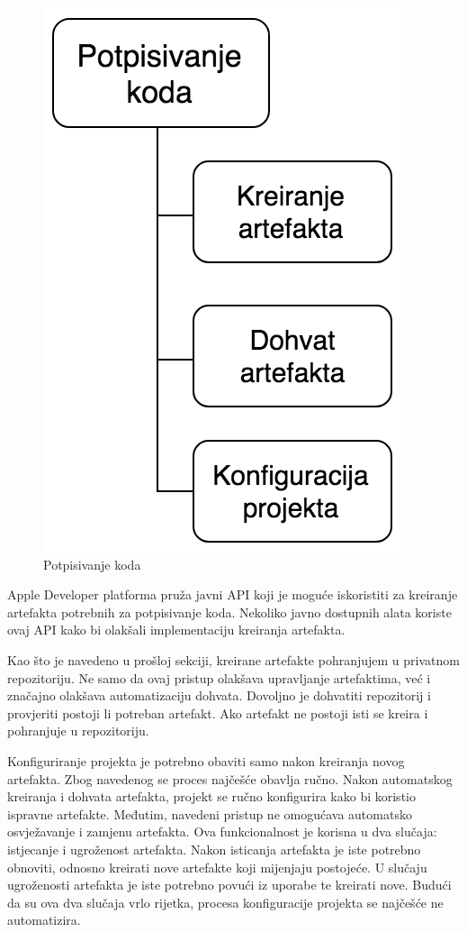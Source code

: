 \documentclass[times, utf8, diplomski, numeric]{fer}
\begin{document}
\begin{figure}
\centering
\includegraphics[scale=0.6]{CodeSigning}
\caption{Potpisivanje koda}
\label{fig:CodeSigning}
\end{figure}

Apple Developer platforma pruža javni API koji je moguće iskoristiti za kreiranje artefakta potrebnih za potpisivanje koda. Nekoliko javno dostupnih alata koriste ovaj API kako bi olakšali implementaciju kreiranja artefakta.

Kao što je navedeno u prošloj sekciji, kreirane artefakte pohranjujem u privatnom repozitoriju. Ne samo da ovaj pristup olakšava upravljanje artefaktima, već i značajno olakšava automatizaciju dohvata. Dovoljno je dohvatiti repozitorij i provjeriti postoji li potreban artefakt. Ako artefakt ne postoji isti se kreira i pohranjuje u repozitoriju.

Konfiguriranje projekta je potrebno obaviti samo nakon kreiranja novog artefakta. Zbog navedenog se proces najčešće obavlja ručno. Nakon automatskog kreiranja i dohvata artefakta, projekt se ručno konfigurira kako bi koristio ispravne artefakte. Međutim, navedeni pristup ne omogućava automatsko osvježavanje i zamjenu artefakta. Ova funkcionalnost je korisna u dva slučaja: istjecanje i ugroženost artefakta. Nakon isticanja artefakta je iste potrebno obnoviti, odnosno kreirati nove artefakte koji mijenjaju postojeće. U slučaju ugroženosti artefakta je iste potrebno povući iz uporabe te kreirati nove. Budući da su ova dva slučaja vrlo rijetka, procesa konfiguracije projekta se najčešće ne automatizira.
\end{document}
